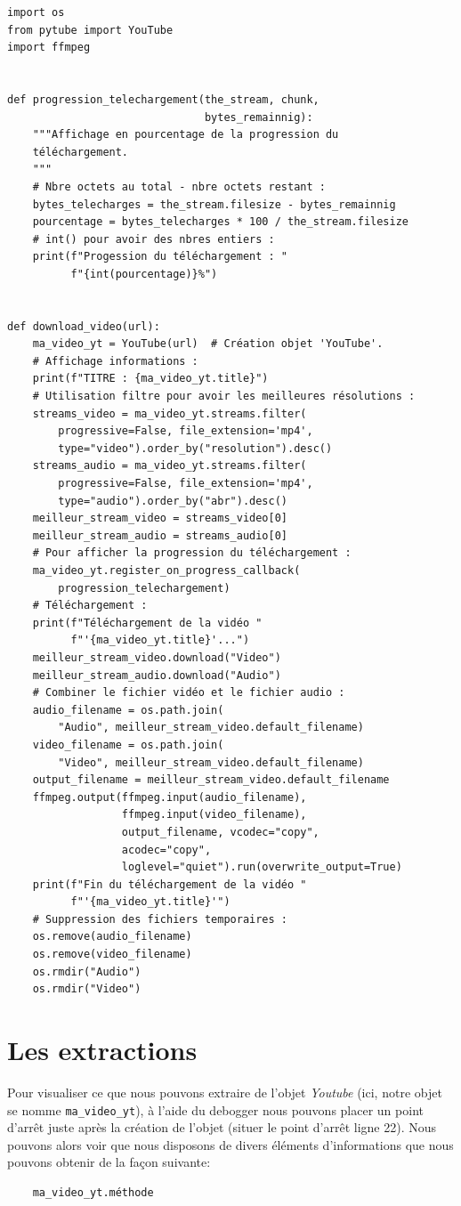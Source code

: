 \documentclass[a4paper,11pt]{book}
\begin{document}
\begin{lstlisting}[caption=Le fichier \textit{yt\_downloader.py}]
import os
from pytube import YouTube
import ffmpeg


def progression_telechargement(the_stream, chunk, 
                               bytes_remainnig):
    """Affichage en pourcentage de la progression du 
    téléchargement.
    """
    # Nbre octets au total - nbre octets restant :
    bytes_telecharges = the_stream.filesize - bytes_remainnig
    pourcentage = bytes_telecharges * 100 / the_stream.filesize
    # int() pour avoir des nbres entiers :
    print(f"Progession du téléchargement : "
          f"{int(pourcentage)}%")


def download_video(url):
    ma_video_yt = YouTube(url)  # Création objet 'YouTube'.
    # Affichage informations :
    print(f"TITRE : {ma_video_yt.title}")
    # Utilisation filtre pour avoir les meilleures résolutions :
    streams_video = ma_video_yt.streams.filter(
        progressive=False, file_extension='mp4',
        type="video").order_by("resolution").desc()
    streams_audio = ma_video_yt.streams.filter(
        progressive=False, file_extension='mp4',
        type="audio").order_by("abr").desc()
    meilleur_stream_video = streams_video[0]
    meilleur_stream_audio = streams_audio[0]
    # Pour afficher la progression du téléchargement :
    ma_video_yt.register_on_progress_callback(
        progression_telechargement)
    # Téléchargement :
    print(f"Téléchargement de la vidéo "
          f"'{ma_video_yt.title}'...")
    meilleur_stream_video.download("Video")
    meilleur_stream_audio.download("Audio")
    # Combiner le fichier vidéo et le fichier audio :
    audio_filename = os.path.join(
        "Audio", meilleur_stream_video.default_filename)
    video_filename = os.path.join(
        "Video", meilleur_stream_video.default_filename)
    output_filename = meilleur_stream_video.default_filename
    ffmpeg.output(ffmpeg.input(audio_filename), 
                  ffmpeg.input(video_filename),
                  output_filename, vcodec="copy", 
                  acodec="copy", 
                  loglevel="quiet").run(overwrite_output=True)
    print(f"Fin du téléchargement de la vidéo "
          f"'{ma_video_yt.title}'")
    # Suppression des fichiers temporaires :
    os.remove(audio_filename)
    os.remove(video_filename)
    os.rmdir("Audio")
    os.rmdir("Video")
\end{lstlisting}
\medskip

\section{Les extractions}
Pour visualiser ce que nous pouvons extraire de l'objet \og \textit{Youtube}\fg{} (ici, notre objet se nomme \texttt{ma\_video\_yt}), à l'aide du debogger nous pouvons placer un point d'arrêt juste après la création de l'objet (situer le point d'arrêt ligne 22). Nous pouvons alors voir que nous disposons de divers éléments d'informations que nous pouvons obtenir de la façon suivante:
\begin{verbatim}
    ma_video_yt.méthode
\end{verbatim} 
\medskip
\end{document}
